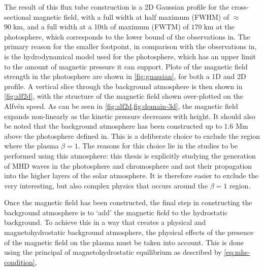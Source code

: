 \documentclass[a4paper,12pt,fourier,authoryear,custommargin]{Classes/PhDThesisPSnPDF}
\providecommand{\DIFaddtex}[1]{{\protect\color{blue}\uwave{#1}}} %
\providecommand{\DIFaddbegin}{} %
\providecommand{\DIFaddend}{} %
\providecommand{\DIFadd}[1]{\texorpdfstring{\DIFaddtex{#1}}{#1}} %
\begin{document}
The result of this flux tube construction is a 2D Gaussian profile for the cross-sectional magnetic field, with a full width at half maximum (FWHM) of $\approx$ $90 \; \mathrm{km}$, and a full width at a 10th of maximum (FWTM) of $170 \; \mathrm{km}$
at the photosphere, which corresponds to the lower bound of the observations in\DIFaddbegin \DIFadd{~}\DIFaddend \cite{sanchezalmeida2004}.
The primary reason for the smaller footpoint, in comparison with the observations in\DIFaddbegin \DIFadd{~}\DIFaddend \cite{utz2013}, is the hydrodynamical model used for the photosphere, which has an upper limit to the amount of magnetic pressure it can support.
Plots of the magnetic field strength in the photosphere are shown in \cref{fig:guassian}, for both a 1D and 2D profile.
A vertical slice through the background atmosphere is then shown in \cref{fig:alf2d}, with the structure of the magnetic field shown over-plotted on the Alfv\'en speed.
As can be seen in \cref{fig:alf2d,fig:domain-3d}, the magnetic field expands non-linearly as the kinetic pressure decreases with height.
It should also be noted that the background atmosphere has been constructed up to $1.6$ Mm above the photosphere defined in\DIFaddbegin \DIFadd{~}\DIFaddend \cite{vernazza1981}.
This is a deliberate choice to exclude the region where the plasma $\beta = 1$.
The reasons for this choice lie in the studies to be performed using this atmosphere: this thesis is explicitly studying the generation of MHD waves in the photosphere and chromosphere and not their propagation into the higher layers of the solar atmosphere.
It is therefore easier to exclude the very interesting, but also complex physics that occurs around the $\beta = 1$ region.

Once the magnetic field has been constructed, the final step in constructing the background atmosphere is to `add' the magnetic field to the hydrostatic background.
To achieve this in a way that creates a physical and magnetohydrostatic background atmosphere, the physical effects of the presence of the magnetic field on the plasma must be taken into account.
This is done using the principal of magnetohydrostatic equilibrium as described by \cref{eq:mhs-condition},
\end{document}
